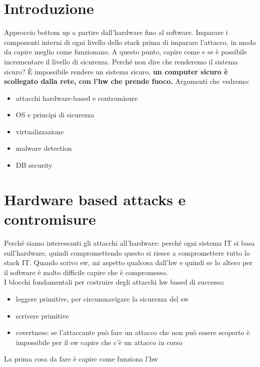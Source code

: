 \documentclass[12pt, oneside]{extbook} %
\begin{document}
\chapter{Introduzione}
Approccio bottom up a partire dall'hardware fino al software. Imparare i componenti interni di ogni livello dello stack prima di imparare l'attacco, in modo da capire meglio come funzionano. A questo punto, capire come e se è possibile incrementare il livello di sicurezza. Perché non dire che renderemo il sistema sicuro? È impossibile rendere un sistema sicuro, \textbf{un computer sicuro è scollegato dalla rete, con l'hw che prende fuoco.}
Argomenti che vedremo:
\begin{itemize}
\item attacchi hardware-based e contromisure
\item OS e principi di sicurezza
\item virtualizzazione
\item malware detection
\item DB security
\end{itemize}

\chapter{Hardware based attacks e contromisure}
Perché siamo interessanti gli attacchi all'hardware: perché ogni sistema IT si basa sull'hardware, quindi compromettendo questo si riesce a compromettere tutto lo stack IT. Quando scrivo sw, mi aspetto qualcosa dall'hw e quindi se lo altero per il software è molto difficile capire che è compromesso.\\ I blocchi fondamentali per costruire degli attacchi hw based di successo:
\begin{itemize}
\item leggere primitive, per circumnavigare la sicurezza del sw
\item scrivere primitive
\item covertness: se l'attaccante può fare un attacco che non può essere scoperto è impossibile per il sw capire che c'è un attacco in corso
\end{itemize}
La prima cosa da fare è capire come funziona l'hw
\end{document}
